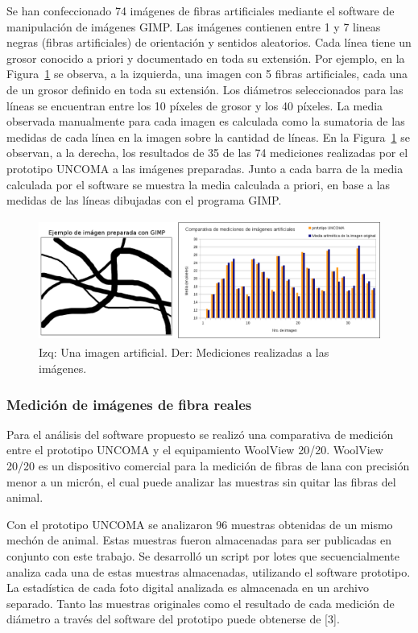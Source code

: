 \documentclass[runningheads,a4paper]{llncs}
\begin{document}
Se han confeccionado 74 imágenes de fibras artificiales mediante el software de manipulación de imágenes GIMP. Las imágenes contienen entre 1 y 7 lineas negras (fibras artificiales) de orientación  y sentidos aleatorios. Cada línea tiene un grosor conocido a priori y documentado en toda su extensión. Por ejemplo, en la Figura~\ref{fig:comparativa-artificial3} se observa, a la izquierda, una imagen con 5 fibras artificiales, cada una de un grosor definido en toda su extensión. Los diámetros seleccionados para las líneas se encuentran entre los 10 píxeles de grosor y los 40 píxeles. La media observada manualmente para cada imagen es calculada como la sumatoria de las medidas de cada línea en la imagen sobre la cantidad de líneas.
En la Figura~\ref{fig:comparativa-artificial3} se observan, a la derecha, los resultados de 35 de las 74 mediciones realizadas por el prototipo UNCOMA a las imágenes preparadas. Junto a cada barra de la media calculada por el software se muestra la media calculada a priori, en base a las medidas de las líneas dibujadas con el programa GIMP.
\begin{figure}
\centering
\includegraphics[height=4cm]{comparativa-artificial3}
\caption{Izq: Una imagen artificial. Der: Mediciones realizadas a las imágenes.}
\label{fig:comparativa-artificial3}
\end{figure}


\subsubsection{Medición de imágenes de fibra reales} 

Para el análisis del software propuesto se realizó una comparativa de medición entre el prototipo UNCOMA y el equipamiento WoolView 20/20. 
WoolView 20/20 es un dispositivo comercial para la medición de fibras de lana con precisión menor a un micrón, el cual puede analizar las muestras sin quitar las fibras del animal. 

Con el prototipo UNCOMA se analizaron 96 muestras obtenidas de un mismo mechón de animal. Estas muestras fueron almacenadas para ser publicadas en conjunto con este trabajo. Se desarrolló un script por lotes que secuencialmente analiza cada una de estas muestras almacenadas, utilizando el software prototipo. La estadística de cada foto digital analizada es almacenada en un archivo separado. Tanto las muestras originales como el resultado de cada medición de diámetro a través del software del prototipo puede obtenerse de [3].
\end{document}
